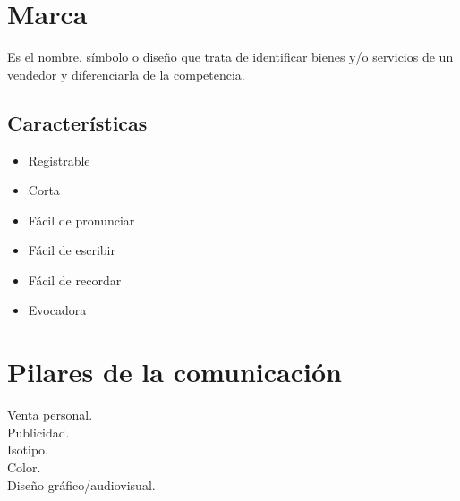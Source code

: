 \documentclass[12pt, spanish, a5paper]{article}
\begin{document}
\newpage

\section{Marca}

Es el nombre, símbolo o diseño que trata de identificar bienes y/o servicios de un vendedor y diferenciarla de la competencia.

\subsection{Características}
\begin{itemize}
	\item Registrable
	\item Corta
	\item Fácil de pronunciar
	\item Fácil de escribir
	\item Fácil de recordar
	\item Evocadora
\end{itemize}

\section{Pilares de la comunicación}

\begin{description}
	\item[Venta personal. ] 
	\item[Publicidad. ] 
	\item[Isotipo. ] 
	\item[Color. ]
	\item[Diseño gráfico/audiovisual. ] 
	
\end{description}



\end{document}
